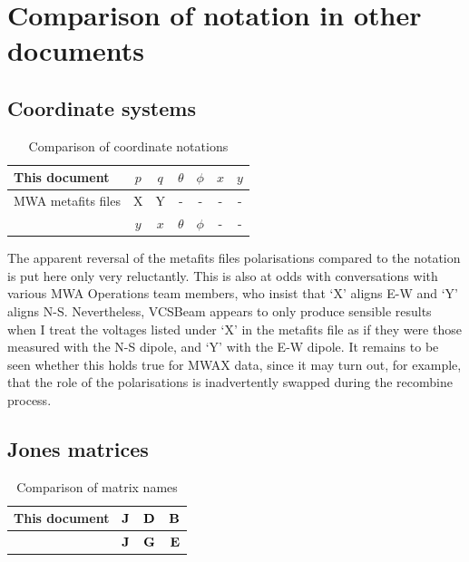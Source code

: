 \documentclass{book}
\newcommand{\vcsbeam}{{\sc VCSBeam}}
\begin{document}
\chapter{Comparison of notation in other documents}

\section{Coordinate systems}

\begin{table}[!hb]
    \centering
    \caption{Comparison of coordinate notations}
    \label{tbl:notations}
    \begin{tabular}{l|cc|cc|cc}
        This document & $p$ & $q$ & $\theta$ & $\phi$ & $x$ & $y$ \\
        \hline
        MWA metafits files       & X & Y & - & - & - & - \\
        \citet{Sokolowski2017} & $y$ & $x$ & $\theta$ & $\phi$ & - & - \\
    \end{tabular}
\end{table}

The apparent reversal of the metafits files polarisations compared to the \citet{Sokolowski2017} notation is put here only very reluctantly.
This is also at odds with conversations with various MWA Operations team members, who insist that `X' aligns E-W and `Y' aligns N-S.
Nevertheless, \vcsbeam{} appears to only produce sensible results when I treat the voltages listed under `X' in the metafits file as if they were those measured with the N-S dipole, and `Y' with the E-W dipole.
It remains to be seen whether this holds true for MWAX data, since it may turn out, for example, that the role of the polarisations is inadvertently swapped during the recombine process.

\section{Jones matrices}

\begin{table}[!hb]
    \centering
    \caption{Comparison of matrix names}
    \label{tbl:notations}
    \begin{tabular}{l|ccc}
        This document & ${\bf J}$ & ${\bf D}$ & ${\bf B}$ \\
        \hline
        \citet{Sokolowski2017} & ${\bf J}$ & ${\bf G}$ & ${\bf E}$ \\
    \end{tabular}
\end{table}

\printindex


\end{document}

